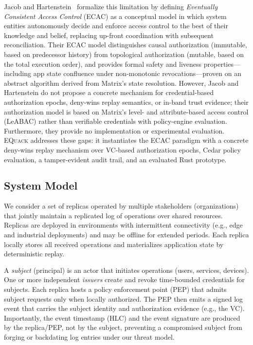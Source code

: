 \documentclass[10pt,journal,compsoc]{IEEEtran}
\newcommand{\equack}{\textsc{EQuack}}
\begin{document}
Jacob and Hartenstein~\cite{jacob2024eventuallyac} formalize this limitation by defining \emph{Eventually Consistent Access Control} (ECAC) as a conceptual model in which system entities autonomously decide and enforce access control to the best of their knowledge and belief, replacing up-front coordination with subsequent reconciliation. Their ECAC model distinguishes causal authorization (immutable, based on predecessor history) from topological authorization (mutable, based on the total execution order), and provides formal safety and liveness properties---including app state confluence under non-monotonic revocations---proven on an abstract algorithm derived from Matrix's state resolution. However, Jacob and Hartenstein do not propose a concrete mechanism for credential-based authorization epochs, deny-wins replay semantics, or in-band trust evidence; their authorization model is based on Matrix's level- and attribute-based access control (LeABAC) rather than verifiable credentials with policy-engine evaluation. Furthermore, they provide no implementation or experimental evaluation. \equack{} addresses these gaps: it instantiates the ECAC paradigm with a concrete deny-wins replay mechanism over VC-based authorization epochs, Cedar policy evaluation, a tamper-evident audit trail, and an evaluated Rust prototype.

\subsection{System Model}\label{subsec:systemModel}

We consider a set of replicas operated by multiple stakeholders (organizations) that jointly maintain a replicated log of operations over shared resources. Replicas are deployed in environments with intermittent connectivity (e.g., edge and industrial deployments) and may be offline for extended periods. Each replica locally stores all received operations and materializes application state by deterministic replay.

A \emph{subject} (principal) is an actor that initiates operations (users, services, devices). One or more independent \emph{issuers} create and revoke time-bounded credentials for subjects. Each replica hosts a policy enforcement point (PEP) that admits subject requests only when locally authorized. The PEP then emits a signed log event that carries the subject identity and authorization evidence (e.g., the VC). Importantly, the event timestamp (HLC) and the event signature are produced by the replica/PEP, not by the subject, preventing a compromised subject from forging or backdating log entries under our threat model.
\end{document}
